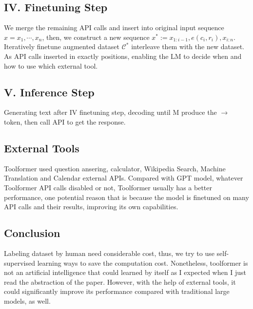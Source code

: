 \documentclass[12pt]{article}
\newcounter{question}
\begin{document}
\subsection*{IV. Finetuning Step}
We merge the remaining API calls and insert into original input sequence $x = x_1, \cdots, x_n$, then, we construct a new sequence $x^* := x_{1:i-1}, e(c_i, r_i), x_{i:n}$. \\
Iteratively finetune augmented dataset $\mathcal{C}^*$
 interleave them with the new dataset. As API calls inserted in exactly positions, enabling the LM to decide when and how to use which external tool.
 
\subsection*{V. Inference Step}
Generating text after IV finetuning step, decoding until M produce the $\rightarrow$ token, then call API to get the response.

\subsection*{External Tools}
Toolformer used question ansering, calculator, Wikipedia Search, Machine Translation and Calendar external APIs. Compared with GPT model, whatever Toolformer API calls disabled or not, Toolformer usually has a better performance, one potential reason that is because the model is finetuned on many API calls and their results, improving its own capabilities.

\subsection*{Conclusion}
Labeling dataset by human need considerable cost, thus, we try to use self-supervised learning ways to save the computation cost. Nonetheless, toolformer is not an artificial intelligence that could learned by itself as I expected when I just read the abstraction of the paper. However, with the help of external tools, it could significantly improve its performance compared with traditional large models, as well.
\end{document}
